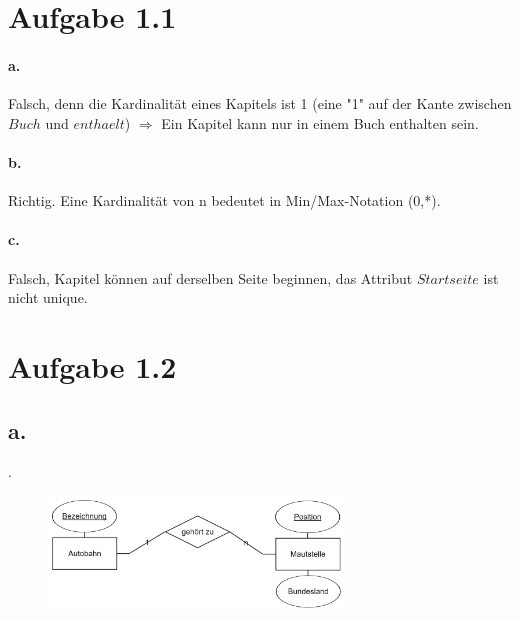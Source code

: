 \documentclass{article}
\begin{document}
	
	
	
	
	\section*{Aufgabe 1.1}
		\paragraph*{a.} Falsch, denn die Kardinalität eines Kapitels ist 1 (eine "1" auf der Kante zwischen $Buch$ und $enthaelt$) $\Rightarrow$ Ein Kapitel kann nur in einem Buch enthalten sein.
		
		\paragraph*{b.} Richtig. Eine Kardinalität von n bedeutet in Min/Max-Notation (0,*).
		
		\paragraph*{c.} Falsch, Kapitel können auf derselben Seite beginnen, das Attribut $Startseite$ ist nicht unique.
		
		
	\section*{Aufgabe 1.2}
		\subsection*{a.}
		.
			\begin{figure}[h]
				\includegraphics[width=0.7\textwidth]{aufgabe_1_2_a.png}
			\end{figure}
		
\end{document}

